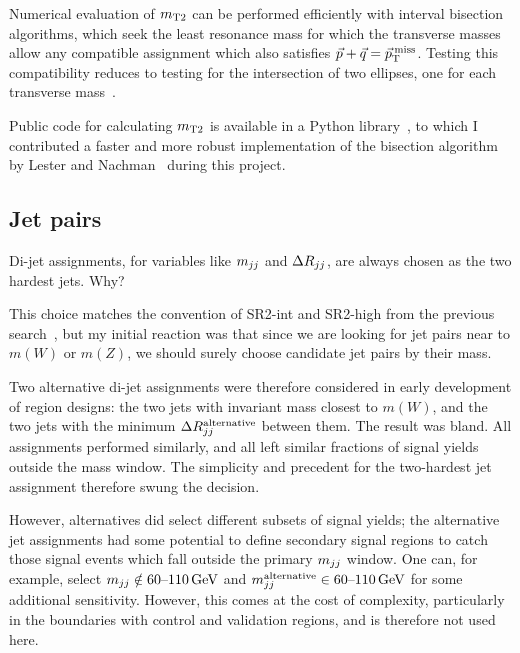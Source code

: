 Numerical evaluation of $\mttwo$ can be performed efficiently with interval
bisection algorithms, which seek the least resonance mass for which the
transverse masses allow any compatible assignment which also satisfies
$\vec p + \vec q = \ptmiss$.
Testing this compatibility reduces to testing for the intersection of two
ellipses, one for each transverse
mass~\cite{cheng2008minimal, lester2015bisection}.

Public code for calculating $\mttwo$ is available in a Python
library~\cite{gillam2021mt2}, to which I contributed a faster and more robust
implementation of the bisection algorithm by
Lester and Nachman~\cite{lester2015bisection} during this project.


\subsection{Jet pairs}
Di-jet assignments, for variables like $\mjj$ and $\rjj$, are always chosen as
the two hardest jets.
Why?

This choice matches the convention of SR2-int and SR2-high from the previous
search~\cite{atlas_23l_SUSY_2016_24}, but my initial reaction was that since we
are looking for jet pairs near to $m(W)$ or $m(Z)$, we should surely choose
candidate jet pairs by their mass.

Two alternative di-jet assignments were therefore considered in early
development of region designs:
the two jets with invariant mass closest to $m(W)$, and the two jets with the
minimum $\rjj^\mathrm{alternative}$ between them.
The result was bland.
All assignments performed similarly, and all left similar fractions of signal
yields outside the mass window.
The simplicity and precedent for the two-hardest jet assignment therefore swung
the decision.

However, alternatives did select different subsets of signal yields;
the alternative jet assignments had some potential to define secondary signal
regions to catch those signal events which fall outside the primary
$\mjj$ window.
One can, for example, select $\mjj \notin 60\textrm{--}110\,\eV[G]$ and
$\mjj^\mathrm{alternative} \in 60\textrm{--}110\,\eV[G]$ for some additional
sensitivity.
However, this comes at the cost of complexity, particularly in the boundaries
with control and validation regions, and is therefore not used here.


